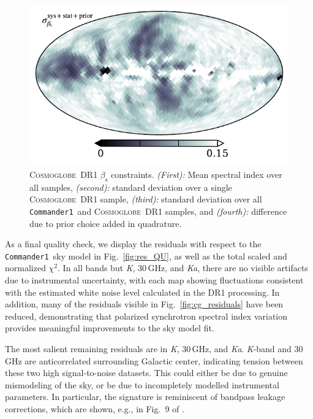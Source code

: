 \documentclass[twocolumn]{../../common/aa}
\def\commanderone{\texttt{Commander1}}
\newcommand{\cosmoglobe}{\textsc{Cosmoglobe}}
\newcommand{\K}[0]{\textit K}
\newcommand{\Ka}[0]{\textit{Ka}}
\begin{document}
\begin{figure}
	\includegraphics[width=\columnwidth]{figures/beta_n0016_sd_stat_inst_prior.pdf}
	\caption{
		\cosmoglobe\ DR1 $\beta_\mathrm s$ constraints. \textit{(First):} Mean spectral index over all samples, \textit{(second):} standard deviation over a single \cosmoglobe\ DR1 sample, \textit{(third):} standard deviation over all \commanderone\ and \cosmoglobe\ DR1 samples, and \textit{(fourth):} difference due to prior choice added in quadrature.}
	\label{fig:beta_16}
\end{figure}



As a final quality check, we display the residuals with respect to the \commanderone\ sky model in Fig.~\ref{fig:res_QU}, as well as the total scaled and normalized $\chi^2$. In all bands but \K, 30\,GHz, and \Ka, there are no visible artifacts due to instrumental uncertainty, with each map showing fluctuations consistent with the estimated white noise level calculated in the DR1 processing.  In addition, many of the residuals visible in Fig.~\ref{fig:cg_residuals} have been reduced, demonstrating that polarized synchrotron spectral index variation provides meaningful improvements to the sky model fit.

The most salient remaining residuals are in \K, 30\,GHz, and \Ka. \K-band and 30\,GHz are anticorrelated surrounding Galactic center, indicating  tension between these two high signal-to-noise datasets. This could either be due to genuine mismodeling of the sky, or be due to incompletely modelled instrumental parameters. In particular, the signature is reminiscent of bandpass leakage corrections, which are shown, e.g., in Fig.~9 of \citet{bp09}.
\end{document}
